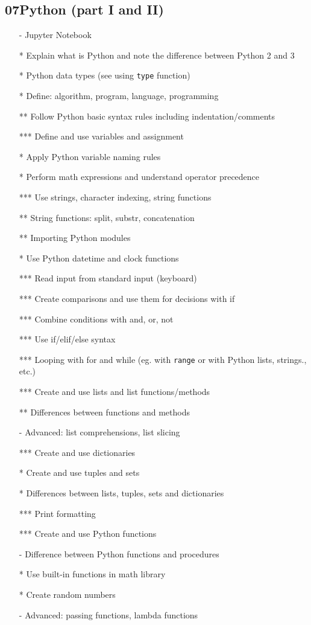 \documentclass{article}%
\begin{document}
\subsection*{07Python (part I and II)}

\begin{itemize}
\item[-] Jupyter Notebook
\item[*] Explain what is Python and note the difference between Python 2 and 3
\item[*]  Python data types (see using {\tt type} function)
\item[*] Define: algorithm, program, language, programming
\item[**] Follow Python basic syntax rules including indentation/comments
\item[***] Define and use variables and assignment
\item[*] Apply Python variable naming rules
\item[*] Perform math expressions and understand operator precedence
\item[***] Use strings, character indexing, string functions
\item[**] String functions: split, substr, concatenation
\item[**] Importing  Python modules
\item[*] Use Python datetime and clock functions
\item[***] Read input from standard input (keyboard)
\item[***] Create comparisons and use them for decisions with if
\item[***] Combine conditions with and, or, not
\item[***] Use if/elif/else syntax
\item[***] Looping with for and while (eg. with {\tt range} or with Python lists, strings., etc.)
\item[***] Create and use lists and list functions/methods
\item[**] Differences between functions and methods
\item[-]  Advanced: list comprehensions, list slicing
\item[***] Create and use dictionaries
\item[*] Create and use tuples and sets 
\item[*] Differences between lists, tuples, sets and dictionaries
\item[***] Print formatting 
\item[***] Create and use Python functions
\item[-] Difference between Python functions and procedures
\item[*] Use built-in functions in math library
\item[*] Create random numbers
\item[-] Advanced: passing functions, lambda functions
\end{itemize}
\end{document}
